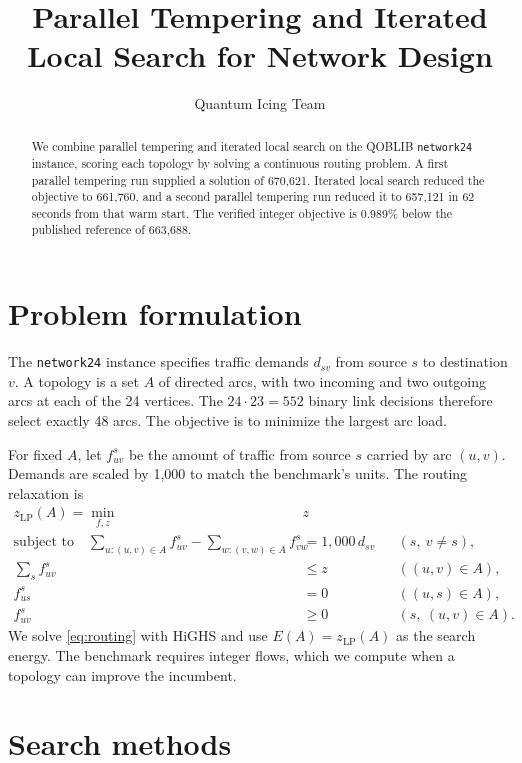 \documentclass[a4paper]{article}
\title{Parallel Tempering and Iterated Local Search for Network Design}
\author{Quantum Icing Team}
\date{}
\begin{document}
\maketitle

\begin{abstract}
We combine parallel tempering and iterated local search on the QOBLIB \texttt{network24} instance, scoring each topology
by solving a continuous routing problem. A first parallel tempering run supplied a solution of 670,621.
Iterated local search reduced the objective to 661,760, and a second parallel tempering run reduced it to 657,121
in 62 seconds from that warm start. The verified integer objective is 0.989\% below the published reference of 663,688.
\end{abstract}

\section{Problem formulation}

The \texttt{network24} instance specifies traffic demands \(d_{sv}\) from source \(s\) to destination \(v\).
A topology is a set \(A\) of directed arcs, with two incoming and two outgoing arcs at each of the 24 vertices.
The \(24\cdot23=552\) binary link decisions therefore select exactly 48 arcs. The objective is to minimize the largest arc load.

For fixed \(A\), let \(f^s_{uv}\) be the amount of traffic from source \(s\) carried by arc \((u,v)\).
Demands are scaled by 1,000 to match the benchmark's units. The routing relaxation is
\begin{equation}
\label{eq:routing}
\begin{aligned}
z_{\mathrm{LP}}(A) = \min_{f,z}\;& z\\
\text{subject to}\quad
\sum_{u:(u,v)\in A} f^s_{uv} - \sum_{w:(v,w)\in A} f^s_{vw}
  &= 1{,}000\,d_{sv} && (s,\ v\ne s),\\
\sum_s f^s_{uv} &\le z && ((u,v)\in A),\\
f^s_{us}&=0 && ((u,s)\in A),\\
f^s_{uv}&\ge 0 && (s,\ (u,v)\in A).
\end{aligned}
\end{equation}
We solve \eqref{eq:routing} with HiGHS and use \(E(A)=z_{\mathrm{LP}}(A)\) as the search energy.
The benchmark requires integer flows, which we compute when a topology can improve the incumbent.

\section{Search methods}
\end{document}
